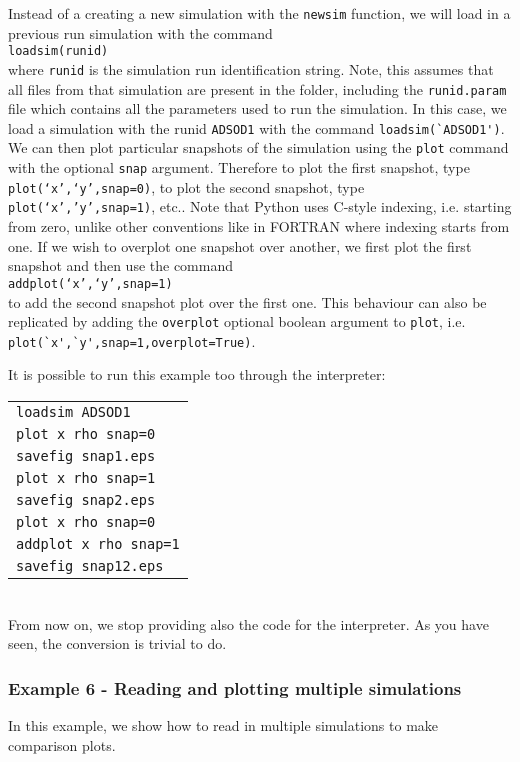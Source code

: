 \documentclass[a4paper]{article}
\newcommand{\var}[1]{\texttt{#1}}
\newcommand{\singlecommand}[1]{\\ \newline \indent \var{#1} \\ \newline \noindent}
\begin{document}
\noindent Instead of a creating a new simulation with the \var{newsim} function, we will load in a previous run simulation with the command \singlecommand{loadsim(runid)} where \var{runid} is the simulation run identification string.  Note, this assumes that all files from that simulation are present in the folder, including the \var{runid.param} file which contains all the parameters used to run the simulation.  In this case, we load a simulation with the runid \var{ADSOD1} with the command \lstinline{loadsim(`ADSOD1')}.  We can then plot particular snapshots of the simulation using the \var{plot} command with the optional \var{snap} argument.  Therefore to plot the first snapshot, type \var{plot(`x',`y',snap=0)}, to plot the second snapshot, type \var{plot(`x','y',snap=1)}, etc..  Note that Python uses C-style indexing, i.e. starting from zero, unlike other conventions like in FORTRAN where indexing starts from one.  If we wish to overplot one snapshot over another, we first plot the first snapshot and then use the command \singlecommand{addplot(`x',`y',snap=1)} to add the second snapshot plot over the first one.  This behaviour can also be replicated by adding the \var{overplot} optional boolean argument to \var{plot}, i.e. \lstinline{plot(`x',`y',snap=1,overplot=True)}.

It is possible to run this example too through the interpreter:\\
\newline
\begin{tabular}{p{14.0cm}}
\var{loadsim ADSOD1 } \\
\var{plot x rho snap=0} \\
\var{savefig snap1.eps} \\
\var{plot x rho snap=1} \\
\var{savefig snap2.eps} \\
\var{plot x rho snap=0} \\
\var{addplot x rho snap=1} \\
\var{savefig snap12.eps} \\
\end{tabular} \\
\newline
From now on, we stop providing also the code for the interpreter. As you have seen, the conversion is trivial to do.



\subsubsection{Example 6 - Reading  and plotting multiple simulations}
In this example, we show how to read in multiple simulations to make comparison plots. \\
\end{document}
